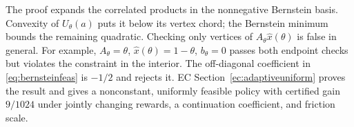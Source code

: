 The proof expands the correlated products in the nonnegative Bernstein basis. Convexity of $U_\theta(a)$ puts it below its vertex chord; the Bernstein minimum bounds the remaining quadratic. Checking only vertices of $A_\theta\widehat x(\theta)$ is false in general. For example, $A_\theta=\theta$, $\widehat x(\theta)=1-\theta$, $b_\theta=0$ passes both endpoint checks but violates the constraint in the interior. The off-diagonal coefficient in \eqref{eq:bernsteinfeas} is $-1/2$ and rejects it. EC Section~\ref{ec:adaptiveuniform} proves the result and gives a nonconstant, uniformly feasible policy with certified gain $9/1024$ under jointly changing rewards, a continuation coefficient, and friction scale.
